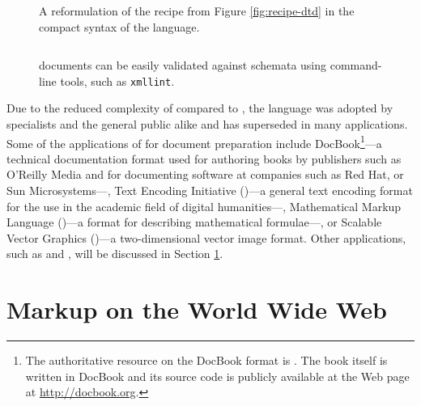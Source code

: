 \documentclass{book}
\begin{document}
        \begin{figure}[H]
          \inputminted{xml}{examples/02/recipe.xsd}
          \caption{A reformulation of the recipe  from Figure
            \ref{fig:recipe-dtd} in the  Schema language.%
            }
          \label{fig:recipe-xsd}
          \inputminted{text}{examples/02/recipe.rnc}
          \caption{A reformulation of the recipe  from Figure
            \ref{fig:recipe-dtd} in the compact syntax of the 
            language.}
          \label{fig:recipe-rnc}
          \inputminted{sh}{examples/02/recipe.sh}
          \caption{ documents can be easily validated against
             schemata using command-line tools, such as
            \texttt{xmllint}.}
        \end{figure}

        Due to the reduced complexity of  compared to
        , the language was adopted by specialists and the general
        public alike and has superseded  in many applications.
        Some of the applications of  for document
        preparation include DocBook\footnote{
          The authoritative resource on the DocBook  format is
          \cite{walsh10}. The book itself is written in DocBook and its source
          code is publicly available at the Web page at
          \url{http://docbook.org}.
        }---a technical documentation format used for authoring books by
        publishers such as O'Reilly Media and for documenting software at
        companies such as Red Hat,  or Sun Microsystems---,
        Text Encoding Initiative ()---a general text encoding
        format for the use in the academic field of digital humanities---,
        Mathematical Markup Language ()---a format for
        describing mathematical formulae---, or Scalable Vector Graphics
        ()---a two-dimensional vector image format. Other
         applications, such as  and
        , will be discussed in Section \ref{sec:www-markup}.
      
      \section{Markup on the World Wide Web}\label{sec:www-markup}
\end{document}

